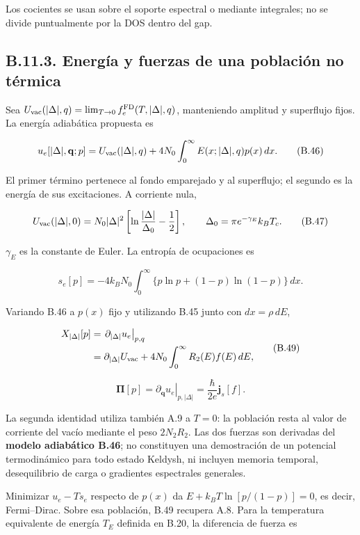 \documentclass[
  spanish,
  10pt,
  a4paper,
]{article}
\begin{document}
Los cocientes se usan sobre el soporte espectral o mediante integrales;
no se divide puntualmente por la DOS dentro del gap.

\subsection{B.11.3. Energía y fuerzas de una población no
térmica}\label{b.11.3.-energuxeda-y-fuerzas-de-una-poblaciuxf3n-no-tuxe9rmica}

Sea \(U_{\rm vac}(|\Delta|,q)=\lim_{T\to0}f_e^{\rm FD}(T,|\Delta|,q)\),
manteniendo amplitud y superflujo fijos. La energía adiabática propuesta
es

\[
u_e[|\Delta|,\mathbf q;p]
=U_{\rm vac}(|\Delta|,q)
+4N_0\int_0^\infty E(x;|\Delta|,q)p(x)\,dx.
\tag{B.46}
\]

El primer término pertenece al fondo emparejado y al superflujo; el
segundo es la energía de sus excitaciones. A corriente nula,

\[
U_{\rm vac}(|\Delta|,0)
=N_0|\Delta|^2\left[\ln\frac{|\Delta|}{\Delta_0}-\frac12\right],
\qquad \Delta_0=\pi e^{-\gamma_E}k_BT_c.
\tag{B.47}
\]

\(\gamma_E\) es la constante de Euler. La entropía de ocupaciones es

\[
s_e[p]=-4k_BN_0\int_0^\infty
\{p\ln p+(1-p)\ln(1-p)\}\,dx.
\tag{B.48}
\]

Variando B.46 a \(p(x)\) fijo y utilizando B.45 junto con
\(dx=\rho\,dE\),

\[
\begin{aligned}
X_{|\Delta|}[p]
&=\left.\partial_{|\Delta|}u_e\right|_{p,q}\\
&=\partial_{|\Delta|}U_{\rm vac}
+4N_0\int_0^\infty R_2(E)f(E)\,dE,
\end{aligned}
\tag{B.49}
\]

\[
\boldsymbol\Pi[p]
=\left.\partial_{\mathbf q}u_e\right|_{p,|\Delta|}
=\frac{\hbar}{2e}\mathbf j_s[f].
\tag{B.50}
\]

La segunda identidad utiliza también A.9 a \(T=0\): la población resta
al valor de corriente del vacío mediante el peso \(2N_2R_2\). Las dos
fuerzas son derivadas del \textbf{modelo adiabático B.46}; no
constituyen una demostración de un potencial termodinámico para todo
estado Keldysh, ni incluyen memoria temporal, desequilibrio de carga o
gradientes espectrales generales.

Minimizar \(u_e-Ts_e\) respecto de \(p(x)\) da \(E+k_BT\ln[p/(1-p)]=0\),
es decir, Fermi--Dirac. Sobre esa población, B.49 recupera A.8. Para la
temperatura equivalente de energía \(T_E\) definida en B.20, la
diferencia de fuerza es
\end{document}
